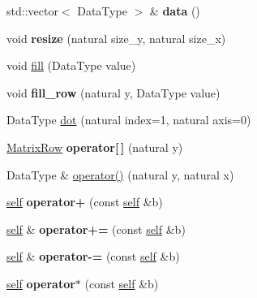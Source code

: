 \begin{DoxyCompactItemize}
std\+::vector$<$ Data\+Type $>$ \& {\bfseries data} ()
\item 
\mbox{\label{classez_1_1maths_1_1Matrix_a7e22335d5a6bbd952e3c2ab2cb862a29}} 
void {\bfseries resize} (natural size\+\_\+y, natural size\+\_\+x)
\item 
void \hyperlink{classez_1_1maths_1_1Matrix_ac2a273c2fae9801582a23e119cd89676}{fill} (Data\+Type value)
\item 
\mbox{\label{classez_1_1maths_1_1Matrix_a92f12ab6e400f003b1fd6a115a84f5bb}} 
void {\bfseries fill\+\_\+row} (natural y, Data\+Type value)
\item 
Data\+Type \hyperlink{classez_1_1maths_1_1Matrix_aa0476234c21980c3896cd0c535aa935c}{dot} (natural index=1, natural axis=0)
\item 
\mbox{\label{classez_1_1maths_1_1Matrix_a40635b102148f88d5c372e5df07c463e}} 
\hyperlink{classez_1_1maths_1_1Matrix_1_1MatrixRow}{Matrix\+Row} {\bfseries operator\mbox{[}$\,$\mbox{]}} (natural y)
\item 
Data\+Type \& \hyperlink{classez_1_1maths_1_1Matrix_a9fdf7683e9eec9f72feedf202c98f5aa}{operator()} (natural y, natural x)
\item 
\mbox{\label{classez_1_1maths_1_1Matrix_a016c8c4cfab8f4544020fcfa52b3e5d7}} 
\hyperlink{classez_1_1maths_1_1Matrix}{self} {\bfseries operator+} (const \hyperlink{classez_1_1maths_1_1Matrix}{self} \&b)
\item 
\mbox{\label{classez_1_1maths_1_1Matrix_a603b18b52b3e0c01ac13eaeed176b1c3}} 
\hyperlink{classez_1_1maths_1_1Matrix}{self} \& {\bfseries operator+=} (const \hyperlink{classez_1_1maths_1_1Matrix}{self} \&b)
\item 
\mbox{\label{classez_1_1maths_1_1Matrix_a5a8b2436a5300bd008afedb7bd24891b}} 
\hyperlink{classez_1_1maths_1_1Matrix}{self} \& {\bfseries operator-\/=} (const \hyperlink{classez_1_1maths_1_1Matrix}{self} \&b)
\item 
\mbox{\label{classez_1_1maths_1_1Matrix_ac2ecb9219b7c3c822a8af597e47f0283}} 
\hyperlink{classez_1_1maths_1_1Matrix}{self} {\bfseries operator$\ast$} (const \hyperlink{classez_1_1maths_1_1Matrix}{self} \&b)

\end{DoxyCompactItemize}
